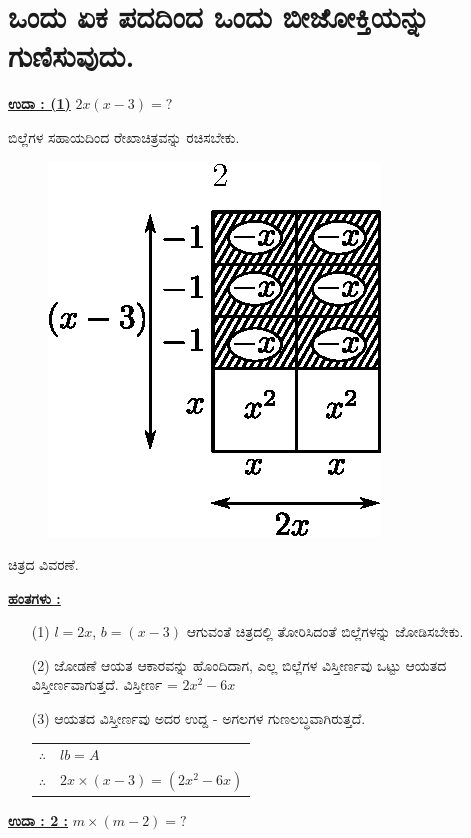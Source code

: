 \section*{ಒಂದು ಏಕ ಪದದಿಂದ ಒಂದು ಬೀಜೋಕ್ತಿಯನ್ನು ಗುಣಿಸುವುದು.}

\noindent
{\textbf{\underline{ಉದಾ : (1)}}} $2x (x-3) = ?$

ಬಿಲ್ಲೆಗಳ ಸಹಾಯದಿಂದ ರೇಖಾಚಿತ್ರವನ್ನು ರಚಿಸಬೇಕು.
\begin{figure}[H]
\centering
\includegraphics[scale=0.8]{src/figure/chap3/fig3-30a.eps}
\end{figure}
ಚಿತ್ರದ ವಿವರಣೆ.

\noindent
{\textbf{\underline{ಹಂತಗಳು :}}} 
\begin{itemize}
\item [(1)] $l = 2x$, $b = (x-3)$ ಆಗುವಂತೆ ಚಿತ್ರದಲ್ಲಿ ತೋರಿಸಿದಂತೆ ಬಿಲ್ಲೆಗಳನ್ನು ಜೋಡಿಸಬೇಕು. 
\item [(2)] ಜೋಡಣೆ ಆಯತ ಆಕಾರವನ್ನು ಹೊಂದಿದಾಗ, ಎಲ್ಲ ಬಿಲ್ಲೆಗಳ ವಿಸ್ತೀರ್ಣವು ಒಟ್ಟು ಆಯತದ ವಿಸ್ತೀರ್ಣವಾಗುತ್ತದೆ. ವಿಸ್ತೀರ್ಣ = $2x^2 - 6x$
\item [(3)] ಆಯತದ ವಿಸ್ತೀರ್ಣವು ಅದರ ಉದ್ದ - ಅಗಲಗಳ ಗುಣಲಬ್ಧವಾಗಿರುತ್ತದೆ. 

\begin{tabular}{ll}
$\therefore$ & $lb = A$\\
$\therefore$ & $2x \times (x - 3) = (2x^2 - 6x)$
\end{tabular}

\end{itemize}

\noindent
{\textbf{\underline{ಉದಾ : 2 :}}} $m \times (m - 2) = ?$

